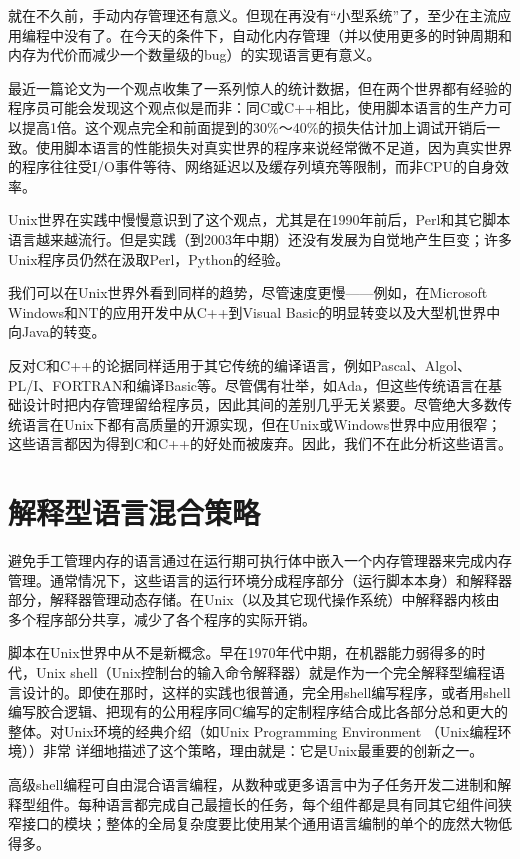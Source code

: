 \documentclass[12pt,oneside]{book}
\begin{document}
就在不久前，手动内存管理还有意义。但现在再没有“小型系统”了，至少在主流应用编程中没有了。在今天的条件下，自动化内存管理（并以使用更多的时钟周期和内存为代价而减少一个数量级的bug）的实现语言更有意义。

最近一篇论文\cite{Prechelt}为一个观点收集了一系列惊人的统计数据，但在两个世界都有经验的程序员可能会发现这个观点似是而非：同C或C++相比，使用脚本语言的生产力可以提高1倍。这个观点完全和前面提到的30\%{}～40\%{}的损失估计加上调试开销后一致。使用脚本语言的性能损失对真实世界的程序来说经常微不足道，因为真实世界的程序往往受I/O事件等待、网络延迟以及缓存列填充等限制，而非CPU的自身效率。

Unix世界在实践中慢慢意识到了这个观点，尤其是在1990年前后，Perl和其它脚本语言越来越流行。但是实践（到2003年中期）还没有发展为自觉地产生巨变；许多Unix程序员仍然在汲取Perl，Python的经验。

我们可以在Unix世界外看到同样的趋势，尽管速度更慢——例如，在Microsoft Windows和NT的应用开发中从C++到Visual Basic的明显转变以及大型机世界中向Java的转变。

反对C和C++的论据同样适用于其它传统的编译语言，例如Pascal、Algol、PL/I、FORTRAN和编译Basic等。尽管偶有壮举，如Ada，但这些传统语言在基础设计时把内存管理留给程序员，因此其间的差别几乎无关紧要。尽管绝大多数传统语言在Unix下都有高质量的开源实现，但在Unix或Windows世界中应用很窄；这些语言都因为得到C和C++的好处而被废弃。因此，我们不在此分析这些语言。


\section{解释型语言混合策略}
避免手工管理内存的语言通过在运行期可执行体中嵌入一个内存管理器来完成内存管理。通常情况下，这些语言的运行环境分成程序部分（运行脚本本身）和解释器部分，解释器管理动态存储。在Unix（以及其它现代操作系统）中解释器内核由多个程序部分共享，减少了各个程序的实际开销。

脚本在Unix世界中从不是新概念。早在1970年代中期，在机器能力弱得多的时代，Unix shell（Unix控制台的输入命令解释器）就是作为一个完全解释型编程语言设计的。即使在那时，这样的实践也很普通，完全用shell编写程序，或者用shell编写胶合逻辑、把现有的公用程序同C编写的定制程序结合成比各部分总和更大的整体。对Unix环境的经典介绍（如Unix Programming Environment （Unix编程环境）\cite{Kernighan-Pike84}）非常
详细地描述了这个策略，理由就是：它是Unix最重要的创新之一。

高级shell编程可自由混合语言编程，从数种或更多语言中为子任务开发二进制和解释型组件。每种语言都完成自己最擅长的任务，每个组件都是具有同其它组件间狭窄接口的模块；整体的全局复杂度要比使用某个通用语言编制的单个的庞然大物低得多。
\end{document}
